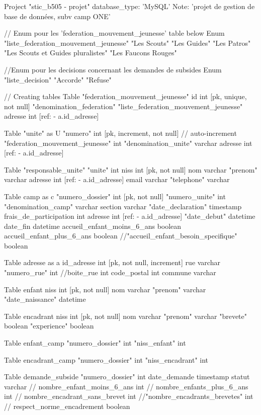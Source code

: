 
Project "stic_b505 - projet" {
  database_type: 'MySQL'
  Note: 'projet de gestion de base de données, subv camp ONE'
}

// Enum pour les 'federation_mouvement_jeunesse' table below
Enum "liste_federation_mouvement_jeunesse" {
  "Les Scouts"
  "Les Guides"
  "Les Patros"
  "Les Scouts et Guides pluralistes"
  "Les Faucons Rouges"
}

//Enum pour les decisions concernant les demandes de subsides
Enum "liste_decision"{
  "Accorde"
  "Refuse"
}

// Creating tables
Table "federation_mouvement_jeunesse" {
  id int [pk, unique, not null]
  "denomination_federation" "liste_federation_mouvement_jeunesse"
  adresse int [ref: - a.id_adresse]
}



Table "unite" as U {
  "numero" int [pk, increment, not null] // auto-increment
  "federation_mouvement_jeunesse" int
  "denomination_unite" varchar
  adresse int [ref: - a.id_adresse]
}

Table "responsable_unite" {
  "unite" int
  niss int [pk, not null]
  nom varchar
  "prenom" varchar
  adresse int [ref: - a.id_adresse]
  email varchar
  "telephone" varchar
}

Table camp as c {
  "numero_dossier" int [pk, not null]
  "numero_unite" int 
  "denomination_camp" varchar
  section varchar
  "date_declaration" timestamp
  frais_de_participation int
  adresse int [ref: - a.id_adresse]
  "date_debut" datetime
  date_fin datetime
  accueil_enfant_moins_6_ans boolean
  accueil_enfant_plus_6_ans boolean
  //"accueil_enfant_besoin_specifique" boolean
}

Table adresse as a {
  id_adresse int [pk, not null, increment]
  rue varchar
  "numero_rue" int
  //boite_rue int
  code_postal int
  commune varchar
  }


Table enfant {
  niss int [pk,  not null]
  nom varchar
  "prenom" varchar
  "date_naissance" datetime
}

Table encadrant {
  niss int [pk, not null]
  nom varchar
  "prenom" varchar
  "brevete" boolean
  "experience" boolean
}


Table enfant_camp {
  "numero_dossier" int
  "niss_enfant" int
}

Table encadrant_camp {
  "numero_dossier" int
  "niss_encadrant" int
}


Table demande_subside {
  "numero_dossier" int 
  date_demande timestamp
  statut varchar
 // nombre_enfant_moins_6_ans int
 // nombre_enfants_plus_6_ans int
 // nombre_encadrant_sans_brevet int
 //"nombre_encadrants_brevetes" int
 // respect_norme_encadrement boolean
}



